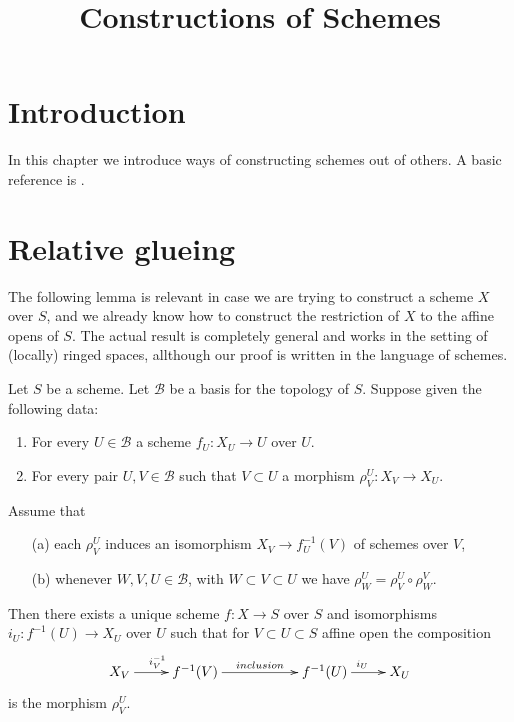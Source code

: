 

%


\title{Constructions of Schemes}


\maketitle

\label{section-phantom}

\tableofcontents

\section{Introduction}
\label{section-introduction}

\noindent
In this chapter we introduce ways of constructing schemes out of others.
A basic reference is \cite{EGA}.





\section{Relative glueing}
\label{section-relative-glueing}

\noindent
The following lemma is relevant in case we are trying to construct a
scheme $X$ over $S$, and we already know how to construct the restriction
of $X$ to the affine opens of $S$. The actual result is completely general
and works in the setting of (locally) ringed spaces, allthough our proof
is written in the language of schemes.

\begin{lemma}
\label{lemma-relative-glueing}
Let $S$ be a scheme.
Let $\mathcal{B}$ be a basis for the topology of $S$.
Suppose given the following data:
\begin{enumerate}
\item For every $U \in \mathcal{B}$ a scheme $f_U : X_U \to U$ over $U$.
\item For every pair $U, V \in \mathcal{B}$ such that
$V \subset U$ a morphism $\rho^U_V : X_V \to X_U$.
\end{enumerate}
Assume that
\begin{enumerate}
\item[(a)] each $\rho^U_V$ induces an isomorphism
$X_V \to f_U^{-1}(V)$ of schemes over $V$,
\item[(b)] whenever $W, V, U \in \mathcal{B}$, with
$W \subset V \subset U$ we have $\rho^U_W = \rho^U_V \circ \rho ^V_W$.
\end{enumerate}
Then there exists a unique scheme $f : X \to S$ over $S$
and isomorphisms $i_U : f^{-1}(U) \to X_U$ over $U$ such that
for $V \subset U \subset S$ affine open the composition
$$
\xymatrix{
X_V \ar[r]^{i_V^{-1}} &
f^{-1}(V) \ar[rr]^{inclusion} & &
f^{-1}(U) \ar[r]^{i_U} &
X_U
}
$$
is the morphism $\rho^U_V$.
\end{lemma}

